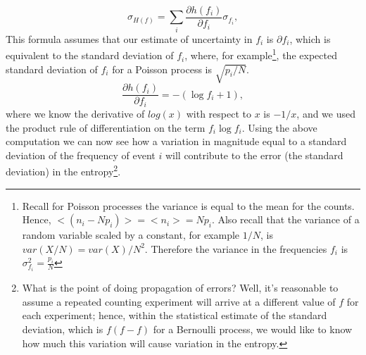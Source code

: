 \begin{equation}
\sigma_{H(f)} = \sum_i \frac{\partial{h(f_i)}}{\partial{f_i}} \sigma_{f_i},
\end{equation}
This formula assumes that our estimate of uncertainty in $f_i$ is $\partial f_i$, which is equivalent to the standard deviation of $f_i$, where, for example\footnote{Recall for Poisson processes the variance is equal to the mean for the counts.  Hence, $< (n_i - Np_i)> = < n_i > =Np_i$.  Also recall that the variance of a random variable scaled by a constant, for example $1/N$, is $var(X/N) = var(X)/N^2$.  Therefore the variance in the frequencies $f_i$ is $\sigma_{f_i}^2= \frac{p_i}{N}$}, the expected standard deviation of $f_i$ for a Poisson process is $\sqrt{p_i/N}$.
\begin{equation}
\frac{\partial{h(f_i)}}{\partial{f_i}} = -(\log{f_i} +1 ),
\end{equation}
where we know the derivative of $log(x)$ with respect to $x$ is $-1/x$, and we used the product rule of differentiation on the term $f_i \log{f_i}$.  Using the above computation we can now see how a variation in magnitude equal to a standard deviation of the frequency of event $i$ will contribute to the error (the standard deviation) in the entropy\footnote{What is the point of doing propagation of errors?  Well, it's reasonable to assume a repeated counting experiment will arrive at a different value of $f$ for each experiment;  hence, within the statistical estimate of the standard deviation, which is $f(f-f)$ for a Bernoulli process, we would like to know how much this variation will cause variation in the entropy.}.

